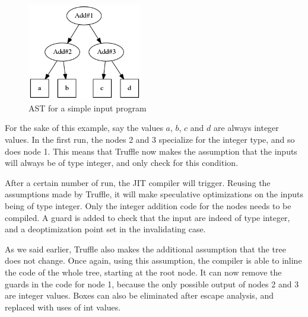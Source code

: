 \documentclass[twoside,11pt,a4paper]{article}
\newcommand{\java}[1]{\textsf{#1}}
\begin{document}
\begin{figure}[thb]
	\centering
	\includegraphics[width=5cm]{./graphs/astadd.png}
	\caption{AST for a simple input program}
	\label{fig:astadd}
\end{figure}

%

For the sake of this example, say the values $a$, $b$, $c$ and $d$ are always integer values. In the first run, the nodes 2 and 3 specialize for the integer type, and so does node 1. This means that Truffle now makes the assumption that the inputs will always be of type integer, and only check for this condition.

After a certain number of run, the JIT compiler will trigger. Reusing the assumptions made by Truffle, it will make speculative optimizations on the inputs being of type integer. Only the integer addition code for the nodes needs to be compiled. A guard is added to check that the input are indeed of type integer, and a deoptimization point set in the invalidating case.

As we said earlier, Truffle also makes the additional assumption that the tree does not change. Once again, using this assumption, the compiler is able to inline the code of the whole tree, starting at the root node. It can now remove the guards in the code for node 1, because the only possible output of nodes 2 and 3 are integer values. Boxes can also be eliminated after escape analysis, and replaced with uses of \java{int} values.
\end{document}
